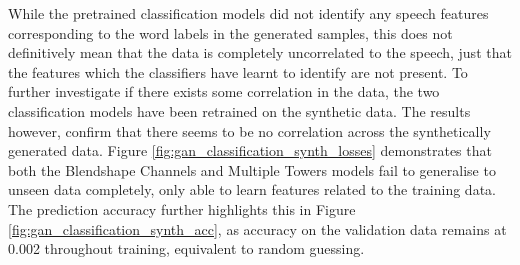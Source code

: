 While the pretrained classification models did not identify any speech features corresponding to the word labels in the generated samples, this does not definitively mean that the data is completely uncorrelated to the speech, just that the features which the classifiers have learnt to identify are not present.
To further investigate if there exists some correlation in the data, the two classification models have been retrained on the synthetic data.
The results however, confirm that there seems to be no correlation across the synthetically generated data.
Figure \ref{fig:gan_classification_synth_losses} demonstrates that both the Blendshape Channels and Multiple Towers models fail to generalise to unseen data completely, only able to learn features related to the training data.
The prediction accuracy further highlights this in Figure \ref{fig:gan_classification_synth_acc}, as accuracy on the validation data remains at 0.002 throughout training, equivalent to random guessing.

